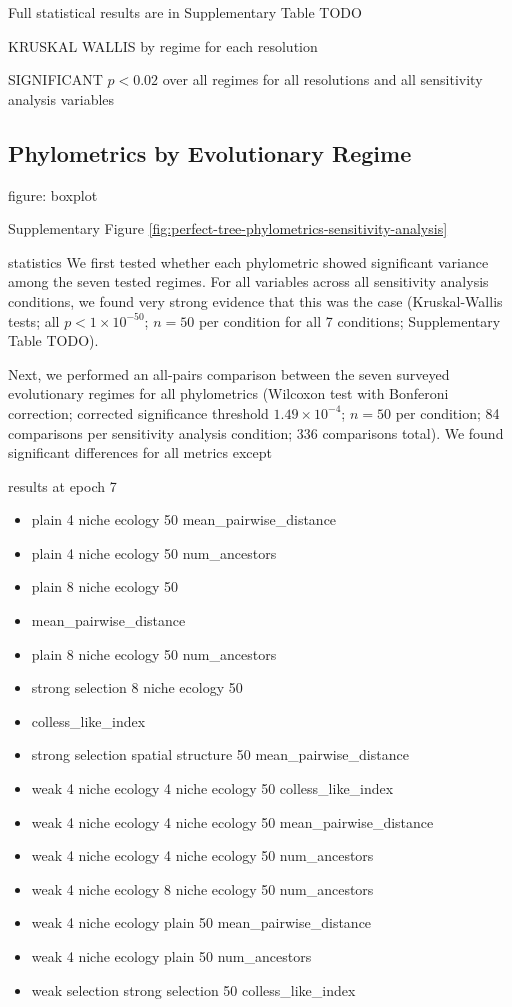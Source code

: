 Full statistical results are in Supplementary Table TODO

KRUSKAL WALLIS by regime for each resolution

SIGNIFICANT $p < 0.02$ over all regimes for all resolutions and all sensitivity analysis variables


\subsection{Phylometrics by Evolutionary Regime}

figure: boxplot


Supplementary Figure \ref{fig:perfect-tree-phylometrics-sensitivity-analysis}



statistics
We first tested whether each phylometric showed significant variance among the seven tested regimes. For all variables across all sensitivity analysis conditions, we found very strong evidence that this was the case (Kruskal-Wallis tests; all $p < 1\times10^{-50}$; $n=50$ per condition for all 7 conditions; Supplementary Table TODO).

Next, we performed an all-pairs comparison between the seven surveyed evolutionary regimes for all phylometrics (Wilcoxon test with Bonferoni correction; corrected significance threshold $1.49 \times 10^{-4}$; $n=50$ per condition; 84 comparisons per sensitivity analysis condition; 336 comparisons total). We found significant differences for all metrics except

results at epoch 7
    \begin{itemize}
        \item plain	4 niche ecology	50	mean_pairwise_distance
        \item plain	4 niche ecology	50	num_ancestors
        \item plain	8 niche ecology	50
        \item mean_pairwise_distance
        \item plain	8 niche ecology	50	num_ancestors
        \item strong selection	8 niche ecology	50
        \item colless_like_index
        \item strong selection	spatial structure	50	mean_pairwise_distance
        \item weak 4 niche ecology	4 niche ecology	50	colless_like_index
        \item weak 4 niche ecology	4 niche ecology	50	mean_pairwise_distance
        \item weak 4 niche ecology	4 niche ecology	50	num_ancestors
        \item weak 4 niche ecology	8 niche ecology	50	num_ancestors
        \item weak 4 niche ecology	plain	50	mean_pairwise_distance
        \item weak 4 niche ecology	plain	50	num_ancestors
        \item weak selection	strong selection	50	colless_like_index
    \end{itemize}

